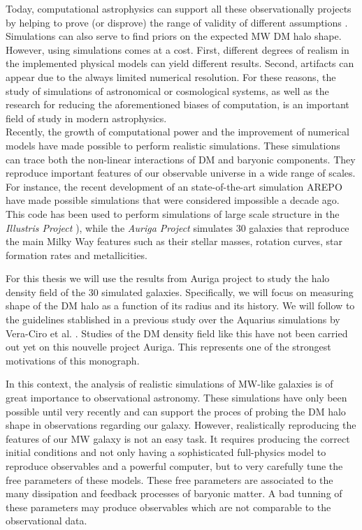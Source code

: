 \documentclass[12pt]{article}
\begin{document}
Today, computational astrophysics can support all these observationally projects by helping to prove (or disprove) the range of validity of different assumptions \cite{prove,bardeen,Vera-Ciro2011}.
Simulations can also serve to find priors on the expected MW DM halo shape.
However, using simulations comes at a cost.
First, different degrees of realism in the implemented physical models can yield different results.
Second, artifacts can appear due to the always limited numerical resolution. 
For these reasons, the study of simulations of astronomical or cosmological systems, as well as the research for reducing the aforementioned biases of computation, is an important field of study in modern astrophysics.\\

Recently, the growth of computational power and the improvement of numerical models have made possible to perform realistic simulations.
These simulations can trace both the non-linear interactions of DM and baryonic components. 
They reproduce important features of our observable universe in a wide range of scales.
For instance, the recent development of an state-of-the-art simulation AREPO \cite{arepo} have made possible simulations that were considered impossible a decade ago.
This code has been used to perform simulations of large scale structure in the \emph{Illustris Project} \cite{Illustris2}), while the 
\emph{Auriga Project} \cite{auriga} simulates 30 galaxies that reproduce the main Milky Way features such as their stellar masses, rotation curves, star formation rates and metallicities.

For this thesis we will use the results from Auriga project \cite{auriga} to study the halo density field of the 30 simulated galaxies.
Specifically, we will focus on measuring shape of the DM halo as a function of its radius and its history.
We will follow to the guidelines stablished in a previous study over the Aquarius simulations by Vera-Ciro et al. \cite{Vera-Ciro2011}. 
Studies of the DM density field like this have not been carried out yet on this nouvelle project Auriga.
This represents one of the strongest motivations of this monograph.

In this context, the analysis of realistic simulations of MW-like galaxies is of great importance to observational astronomy. 
These simulations have only been possible until very recently \cite{aquarius} and can support the proces of probing the DM halo shape in observations regarding our galaxy.
However, realistically reproducing the features of our MW galaxy is not an easy task. 
It requires producing the correct initial conditions and not only having a sophisticated full-physics model to reproduce observables and a powerful computer, but to very carefully tune the free parameters of these models. 
These free parameters are associated to the many dissipation and feedback processes of baryonic matter.
A bad tunning of these parameters may produce observables which are not comparable to the observational data.\\
\end{document}

